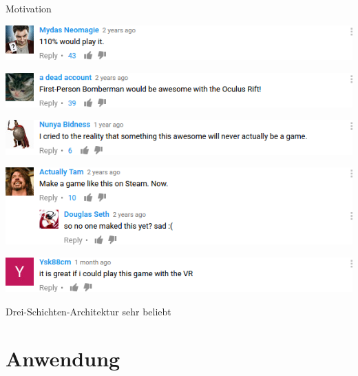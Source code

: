 \documentclass{beamer}
\begin{document}
  \begin{frame}{Motivation}
  	\begin{center}
  		\includegraphics[width=.9\textwidth]{bilder/comment_1.png}
  	\end{center}
  	
  	\begin{center}
  		\includegraphics[width=.9\textwidth]{bilder/comment_2.png}
  	\end{center}
  	
  	\begin{center}
  		\includegraphics[width=.9\textwidth]{bilder/comment_3.png}
  	\end{center}
  	
  	\begin{center}
  		\includegraphics[width=.9\textwidth]{bilder/comment_4.png}
  	\end{center}
  	
  	\begin{center}
  		\includegraphics[width=.9\textwidth]{bilder/comment_5.png}
  	\end{center}
  	
  	
  	\begin{center}
  		Drei-Schichten-Architektur sehr beliebt
  	\end{center}
  \end{frame}
  
  \section{Anwendung}
  
\end{document}
